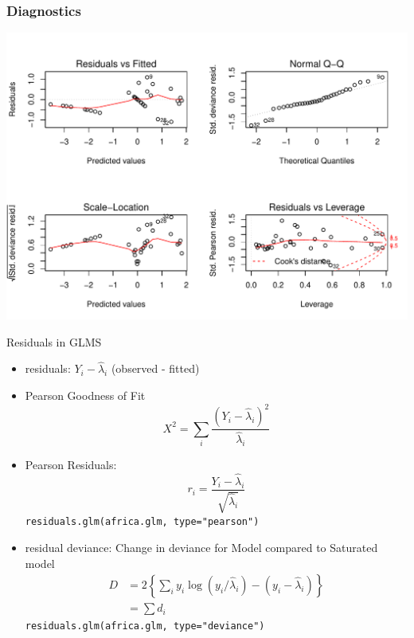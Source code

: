 \documentclass[handout]{beamer}\usepackage[]{graphicx}\usepackage[]{color}
\makeatletter
\def\maxwidth{ %
  \ifdim\Gin@nat@width>\linewidth
    \linewidth
  \else
    \Gin@nat@width
  \fi
}
\newenvironment{knitrout}{}{} %
\makeatother
\begin{document}
\begin{frame}[fragile]\frametitle{Diagnostics}
\begin{knitrout}
\color{fgcolor}
\includegraphics[width=\maxwidth]{figure/diag-1} 

\end{knitrout}

\end{frame}

\begin{frame} {Residuals in GLMS}

\begin{itemize}
\item residuals:  $Y_i - \hat{\lambda}_i$  (observed - fitted)
\item Pearson Goodness of Fit
$$X^2 = \sum_i \frac{(Y_i -  \hat{\lambda}_i)^2} {\hat{\lambda}_i}$$
\item Pearson Residuals:
$$r_i =  \frac{Y_i -  \hat{\lambda}_i}  {\sqrt{ \hat{\lambda}_i } }$$
{\tt residuals.glm(africa.glm, type="pearson")}
\item residual deviance: Change in deviance for Model compared to Saturated model
\begin{align*}
D & = 2 \left\{
\sum_i y_i \log(y_i/\hat{\lambda}_i) - (y_i - \hat{\lambda}_i)
\right\} \\
 &  =  \sum d_i
 \end{align*}
 {\tt residuals.glm(africa.glm, type="deviance")}
\end{itemize}
\end{frame}
\end{document}
